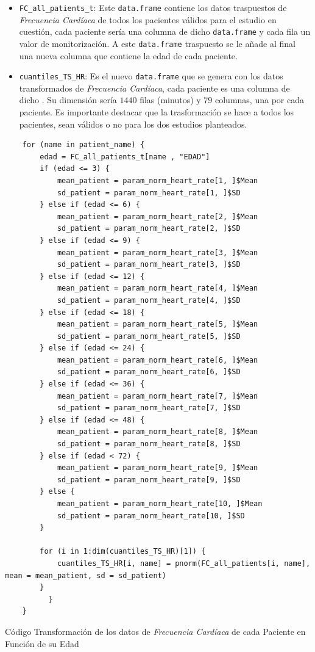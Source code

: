 \begin{itemize}
    \item \texttt{FC\_all\_patients\_t}: Este \texttt{data.frame} contiene los datos traspuestos de \textit{Frecuencia Cardíaca} de todos los pacientes válidos para el estudio en cuestión, cada paciente sería una columna de dicho \texttt{data.frame} y cada fila un valor de monitorización. A este \texttt{data.frame} traspuesto se le añade al final una nueva columna que contiene la edad de cada paciente.
    \item \texttt{cuantiles\_TS\_HR}: Es el nuevo \texttt{data.frame} que se genera con los datos transformados de \textit{Frecuencia Cardíaca}, cada paciente es una columna de dicho . Su dimensión sería $1440$ filas (minutos) y $79$ columnas, una por cada paciente. Es importante destacar que la trasformación se hace a todos los pacientes, sean válidos o no para los dos estudios planteados. 
\end{itemize}

\begin{code}[H]
    \begin{lstlisting}
    for (name in patient_name) {
        edad = FC_all_patients_t[name , "EDAD"]
        if (edad <= 3) {
            mean_patient = param_norm_heart_rate[1, ]$Mean
            sd_patient = param_norm_heart_rate[1, ]$SD
        } else if (edad <= 6) {
            mean_patient = param_norm_heart_rate[2, ]$Mean
            sd_patient = param_norm_heart_rate[2, ]$SD
        } else if (edad <= 9) {
            mean_patient = param_norm_heart_rate[3, ]$Mean
            sd_patient = param_norm_heart_rate[3, ]$SD
        } else if (edad <= 12) {
            mean_patient = param_norm_heart_rate[4, ]$Mean
            sd_patient = param_norm_heart_rate[4, ]$SD
        } else if (edad <= 18) {
            mean_patient = param_norm_heart_rate[5, ]$Mean
            sd_patient = param_norm_heart_rate[5, ]$SD
        } else if (edad <= 24) {
            mean_patient = param_norm_heart_rate[6, ]$Mean
            sd_patient = param_norm_heart_rate[6, ]$SD
        } else if (edad <= 36) {
            mean_patient = param_norm_heart_rate[7, ]$Mean
            sd_patient = param_norm_heart_rate[7, ]$SD
        } else if (edad <= 48) {
            mean_patient = param_norm_heart_rate[8, ]$Mean
            sd_patient = param_norm_heart_rate[8, ]$SD
        } else if (edad < 72) {
            mean_patient = param_norm_heart_rate[9, ]$Mean
            sd_patient = param_norm_heart_rate[9, ]$SD
        } else {
            mean_patient = param_norm_heart_rate[10, ]$Mean
            sd_patient = param_norm_heart_rate[10, ]$SD
        }
        
        for (i in 1:dim(cuantiles_TS_HR)[1]) {
            cuantiles_TS_HR[i, name] = pnorm(FC_all_patients[i, name], mean = mean_patient, sd = sd_patient)
        }
          }
    }
    \end{lstlisting}
    \caption{Código Transformación de los datos de \textit{Frecuencia Cardíaca} de cada Paciente en Función de su Edad}
    \label{cod:transformación-frecuencia-cardiaca}
\end{code}


